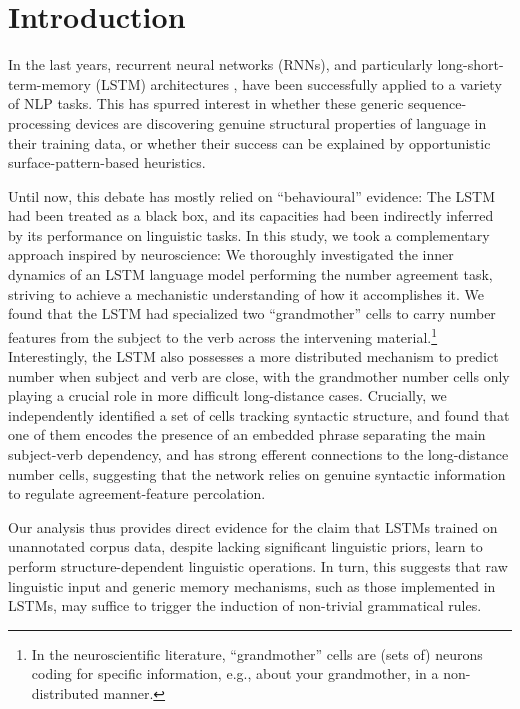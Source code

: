 \section{Introduction}

In the last years, recurrent neural networks (RNNs), and particularly
long-short-term-memory (LSTM) architectures
\cite{Hochreiter:Schmidhuber:1997}, have been successfully applied to
a variety of NLP tasks. This has spurred interest in whether these
generic sequence-processing devices are discovering genuine structural
properties of language in their training data, or whether their
success can be explained by opportunistic surface-pattern-based
heuristics.

Until now, this debate has mostly relied on ``behavioural'' evidence:
The LSTM had been treated as a black box, and its capacities had been indirectly
inferred by its performance on linguistic tasks. In this study, we took a
complementary approach inspired by neuroscience: We thoroughly investigated
the inner dynamics of an LSTM language model performing the number agreement task,
striving to achieve a mechanistic understanding of how it accomplishes
it. We found that the LSTM had specialized two ``grandmother'' cells
\cite{Bowers:2009} to carry number features from the subject to the
verb across the intervening material.\footnote{In the neuroscientific
  literature, ``grandmother'' cells are (sets of) neurons coding for
  specific information, e.g., about your grandmother, in a
  non-distributed manner.} Interestingly, the LSTM also
possesses a more distributed mechanism to predict number when subject
and verb are close, with the grandmother number cells only playing a
crucial role in more difficult long-distance cases. Crucially, we
independently identified a set of cells tracking syntactic structure,
and found that one of them encodes the presence of an embedded phrase
separating the main subject-verb dependency, and has strong efferent
connections to the long-distance number cells, suggesting that the
network relies on genuine syntactic information to regulate
agreement-feature percolation.

Our analysis thus provides direct evidence for the claim that LSTMs
trained on unannotated corpus data, despite
lacking significant linguistic priors, learn to perform
structure-dependent linguistic operations. In turn, this suggests that
raw linguistic input and generic memory mechanisms, such as those
implemented in LSTMs, may suffice to trigger the induction of
non-trivial grammatical rules.
